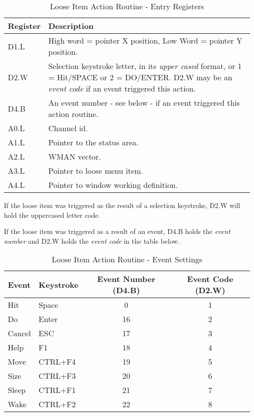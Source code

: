 \begin{table}[htbp]
\centering
\begin{tabular}{l p{}}
\toprule
\textbf{Register} & \textbf{Description}  \\
\midrule
%
D1.L & High word = pointer X position, Low Word = pointer Y position.  \\
D2.W & Selection keystroke letter, in its \emph{upper cased} format, or 1 = Hit/SPACE or 2 = DO/ENTER.  D2.W may be an \emph{event code} if an event triggered this action.  \\
D4.B & An event number - see below - if an event triggered this action routine.  \\
A0.L & Channel id.  \\
A1.L & Pointer to the status area.  \\
A2.L & WMAN vector.  \\
A3.L & Pointer to loose menu item.  \\
A4.L & Pointer to window working definition.  \\
%
\bottomrule
\end{tabular}
\caption{Loose Item Action Routine - Entry Registers}
\label{tab:Loose ItemActionRoutineEntryRegisters}
\end{table}

If the loose item was triggered as the result of a selection
    keystroke, D2.W will hold the uppercased letter code.

If the loose item was triggered as a result of an event, D4.B holds
    the \emph{event number} and D2.W holds the \emph{event
    code} in the table below.


\begin{table}[htbp]
\centering
\begin{tabular}{l l c c}
\toprule
\textbf{Event} & \textbf{Keystroke} & \textbf{Event Number (D4.B)} & \textbf{Event Code (D2.W)}  \\
\midrule
%
Hit    & Space    &  0 & 1 \\
Do     & Enter    & 16 & 2 \\
Cancel & ESC      & 17 & 3 \\
Help   & F1       & 18 & 4 \\
Move   & CTRL+F4  & 19 & 5 \\
Size   & CTRL+F3  & 20 & 6 \\
Sleep  & CTRL+F1  & 21 & 7 \\
Wake   & CTRL+F2  & 22 & 8 \\
%
\bottomrule
\end{tabular}
\caption{Loose Item Action Routine - Event Settings}
\label{tab:Loose ItemActionRoutineEventSettings}
\end{table}

